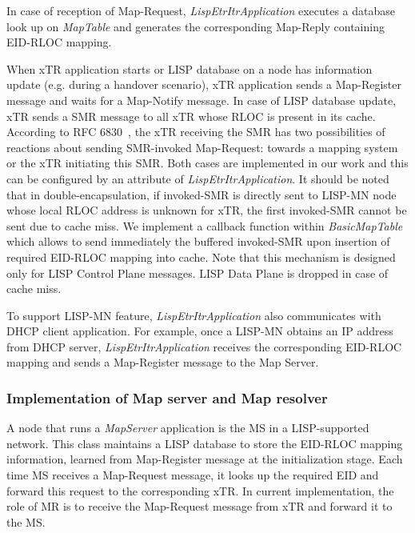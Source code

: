 In case of reception of Map-Request, \emph{LispEtrItrApplication} executes a database look up on \emph{MapTable} and generates the corresponding Map-Reply containing EID-RLOC mapping.

When xTR application starts or LISP database on a node has information update (e.g. during a handover scenario), xTR application sends a Map-Register message and waits for a Map-Notify message. In case of LISP database update, xTR sends a SMR message to all xTR whose RLOC is present in its cache. %
According to RFC 6830~\cite{rfc6830}, the xTR receiving the SMR has two possibilities of reactions about sending SMR-invoked Map-Request:  towards a mapping system or the xTR initiating this SMR. Both cases are implemented in our work and this can be configured by an attribute of \emph{LispEtrItrApplication}. It should be noted that in double-encapsulation, if invoked-SMR is directly sent to LISP-MN node whose local RLOC address is unknown for xTR, the first invoked-SMR cannot be sent due to cache miss. We implement a callback function within \emph{BasicMapTable} which allows to send immediately the buffered invoked-SMR upon insertion of required EID-RLOC mapping into cache. Note that this mechanism is designed only for LISP Control Plane messages. LISP Data Plane is dropped in case of cache miss.

To support LISP-MN feature, \emph{LispEtrItrApplication} also communicates with DHCP client application. For example, once a LISP-MN obtains an IP address from DHCP server, \emph{LispEtrItrApplication} receives the corresponding EID-RLOC mapping and sends a Map-Register message to the Map Server.

\subsubsection{Implementation of Map server and Map resolver}
A node that runs a \emph{MapServer} application is the MS in a LISP-supported network. This class maintains a LISP database to store the EID-RLOC mapping information, learned from Map-Register message at the initialization stage. Each time MS receives a Map-Request message, it looks up the required EID and forward this request to the corresponding xTR. In current implementation, the role of MR is to receive the Map-Request message from xTR and forward it to the MS.

